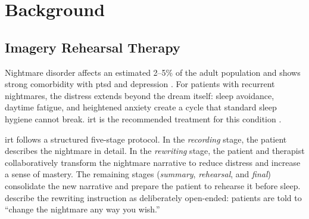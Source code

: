 \chapter{Background}
\label{chap:background}


\section{Imagery Rehearsal Therapy}
\label{sec:bg-irt}
%
%
%

Nightmare disorder affects an estimated 2--5\% of the adult population
\parencite{YPHMANIU,HM68TTLK,Q24CN9LD} and shows strong comorbidity
with \gls{ptsd} and depression \parencite{34M7Y3F8}. For patients with recurrent nightmares, the distress
extends beyond the dream itself: sleep avoidance, daytime fatigue, and
heightened anxiety create a cycle that standard sleep hygiene cannot break.
\gls{irt} is the recommended treatment for this condition
\parencite{34M7Y3F8, FGA5H3ZD}.

\gls{irt} follows a structured five-stage protocol. In the \emph{recording}
stage, the patient describes the nightmare in detail. In the \emph{rewriting}
stage, the patient and therapist collaboratively transform the nightmare
narrative to reduce distress and increase a sense of mastery. The remaining
stages (\emph{summary}, \emph{rehearsal}, and \emph{final}) consolidate the
new narrative and prepare the patient to rehearse it before sleep.
\textcite{FGA5H3ZD} describe the rewriting instruction as deliberately
open-ended: patients are told to ``change the nightmare any way you wish.''

